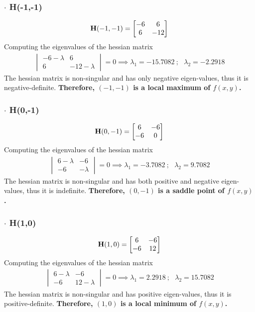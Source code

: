 \subsubsection*{$\bm\cdot$ H(-1,-1)}
\begin{align*}
{\bf H} (-1,-1) =
\begin{bmatrix}
-6 & 6 \\
6 & -12
\end{bmatrix}
\end{align*}
Computing the eigenvalues of the hessian matrix
\begin{align*}
\begin{vmatrix}
-6-\lambda & 6 \\
6 & -12-\lambda
\end{vmatrix} = 0 \implies \lambda_1 = -15.7082\ ; \ \ \ \lambda_2 = -2.2918
\end{align*}
The hessian matrix is non-singular and has only negative eigen-values, thus it is negative-definite. {\bf Therefore, $(-1,-1)$ is a local maximum of $f(x,y)$.} 
\subsubsection*{$\bm\cdot$ H(0,-1)}
\begin{align*}
{\bf H} (0,-1) = 
\begin{bmatrix}
6 & -6 \\
-6 & 0
\end{bmatrix}
\end{align*}
Computing the eigenvalues of the hessian matrix
\begin{align*}
\begin{vmatrix}
6-\lambda & -6 \\
-6 & -\lambda
\end{vmatrix} = 0 \implies \lambda_1 = -3.7082\ ; \ \ \ \lambda_2 = 9.7082
\end{align*}
The hessian matrix is non-singular and has both positive and negative eigen-values, thus it is indefinite. { \bf Therefore, $(0,-1)$ is a saddle point of $f(x,y)$.} 
\subsubsection*{$\bm\cdot$ H(1,0)}
\begin{align*}
{\bf H} (1,0) = 
\begin{bmatrix}
6 & -6 \\
-6 & 12
\end{bmatrix}
\end{align*}
Computing the eigenvalues of the hessian matrix
\begin{align*}
\begin{vmatrix}
6-\lambda & -6 \\
-6 & 12-\lambda
\end{vmatrix} = 0 \implies \lambda_1 = 2.2918\ ; \ \ \ \lambda_2 = 15.7082
\end{align*}
The hessian matrix is non-singular and has positive eigen-values, thus it is positive-definite. {\bf Therefore, $(1,0)$ is a local minimum of $f(x,y)$.} 
